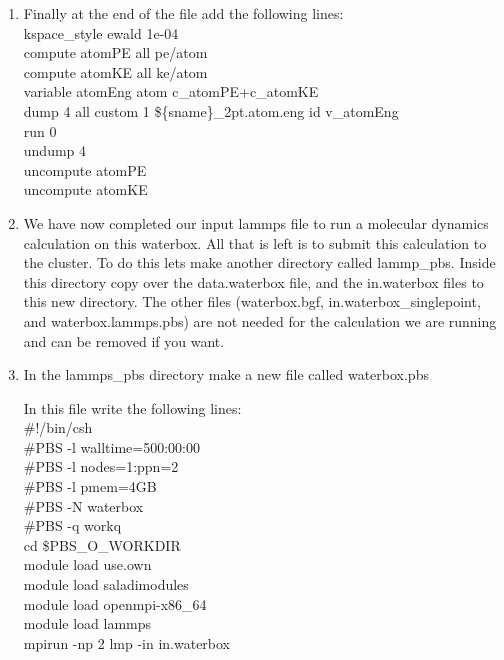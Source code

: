 \documentclass{article}
\begin{document}
\begin{enumerate}
\item Finally at the end of the file add the following lines:\\
kspace\_style    ewald 1e-04\\
compute     \hspace{10mm}    atomPE all pe/atom\\
compute     \hspace{10mm}    atomKE all ke/atom\\
variable    \hspace{10mm}    atomEng atom c\_atomPE+c\_atomKE\\
dump        \hspace{12mm}    4 all custom 1 \$\{sname\}\_2pt.atom.eng id v\_atomEng\\
run         \hspace{15mm}    0\\
undump      \hspace{8mm}    4\\
uncompute   \hspace{6mm}    atomPE\\
uncompute   \hspace{6mm}    atomKE\\

\item We have now completed our input lammps file to run a molecular dynamics calculation on this waterbox.
All that is left is  to submit this calculation to the cluster. 
To do this lets make another directory called lammp\_pbs.
Inside this directory copy over the data.waterbox file, and the in.waterbox files to this new directory. 
The other files (waterbox.bgf, in.waterbox\_singlepoint, and waterbox.lammps.pbs) are not needed for the calculation we are running and can be removed if you want. \\

\item In the lammps\_pbs directory make a new file called waterbox.pbs

In this file write the following lines:\\
\#!/bin/csh\\
 \#PBS -l walltime=500:00:00\\
 \#PBS -l nodes=1:ppn=2\\
 \#PBS -l pmem=4GB\\
 \#PBS -N waterbox\\
 \#PBS -q workq\\
 cd \$PBS\_O\_WORKDIR\\
 module load use.own\\
 module load saladimodules\\
 module load openmpi-x86\_64\\
 module load lammps\\
 mpirun -np 2 lmp -in in.waterbox\\


\end{enumerate}
\end{document}
